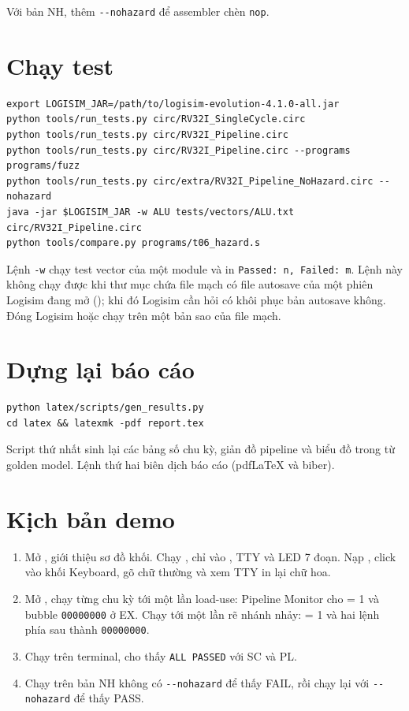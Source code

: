 \documentclass[../report.tex]{subfiles}
\begin{document}
Với bản NH, thêm \texttt{-{}-nohazard} để assembler chèn \texttt{nop}.

\section{Chạy test}

\begin{lstlisting}
export LOGISIM_JAR=/path/to/logisim-evolution-4.1.0-all.jar
python tools/run_tests.py circ/RV32I_SingleCycle.circ
python tools/run_tests.py circ/RV32I_Pipeline.circ
python tools/run_tests.py circ/RV32I_Pipeline.circ --programs programs/fuzz
python tools/run_tests.py circ/extra/RV32I_Pipeline_NoHazard.circ --nohazard
java -jar $LOGISIM_JAR -w ALU tests/vectors/ALU.txt circ/RV32I_Pipeline.circ
python tools/compare.py programs/t06_hazard.s
\end{lstlisting}

Lệnh \texttt{-w} chạy test vector của một module và in \texttt{Passed: n, Failed: m}. Lệnh này không chạy được khi
thư mục chứa file mạch có file autosave của một phiên Logisim đang mở (); khi
đó Logisim cần hỏi có khôi phục bản autosave không. Đóng Logisim hoặc chạy trên một bản sao của file mạch.

\section{Dựng lại báo cáo}

\begin{lstlisting}
python latex/scripts/gen_results.py
cd latex && latexmk -pdf report.tex
\end{lstlisting}

Script thứ nhất sinh lại các bảng số chu kỳ, giản đồ pipeline và biểu đồ trong  từ golden
model. Lệnh thứ hai biên dịch báo cáo (pdfLaTeX và biber).

\section{Kịch bản demo}

\begin{enumerate}
  \item Mở , giới thiệu sơ đồ khối. Chạy , chỉ vào , TTY
        và LED 7 đoạn. Nạp , click vào khối Keyboard, gõ chữ thường và xem TTY in lại chữ hoa.
  \item Mở , chạy từng chu kỳ tới một lần load-use: Pipeline Monitor cho  = 1 và
        bubble \texttt{00000000} ở EX. Chạy tới một lần rẽ nhánh nhảy:  = 1 và hai lệnh phía sau
        thành \texttt{00000000}.
  \item Chạy  trên terminal, cho thấy \texttt{ALL PASSED} với SC và PL.
  \item Chạy  trên bản NH không có \texttt{-{}-nohazard} để thấy FAIL, rồi chạy lại với
        \texttt{-{}-nohazard} để thấy PASS.
\end{enumerate}
\end{document}

